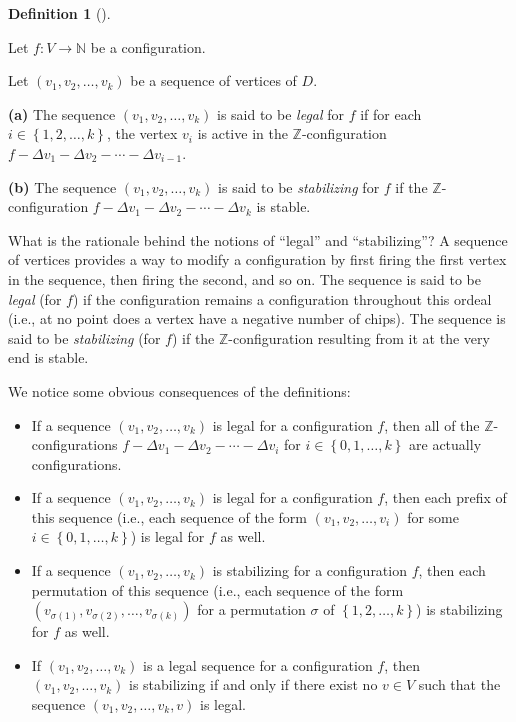 \documentclass[numbers=enddot,12pt,final,onecolumn,notitlepage]{scrartcl}%
\theoremstyle{definition}
\newtheorem{defi}[theo]{Definition}
\newenvironment{definition}[1][]
{\begin{defi}[#1]\begin{leftbar}}
{\end{leftbar}\end{defi}}
\newcommand{\NN}{\mathbb{N}}
\newcommand{\ZZ}{\mathbb{Z}}
\newcommand{\set}[1]{\left\{ #1 \right\}}
\newcommand{\tup}[1]{\left( #1 \right)}
\begin{document}
\begin{definition}
Let $f : V \to \NN$ be a configuration.

Let $\tup{v_1, v_2, \ldots, v_k}$ be a sequence of vertices of
$D$.

\textbf{(a)} The sequence $\tup{v_1, v_2, \ldots, v_k}$ is said
to be \textit{legal} for $f$ if for each
$i \in \set{1, 2, \ldots, k}$, the vertex $v_i$ is active in
the $\ZZ$-configuration
$f - \Delta v_1 - \Delta v_2 - \cdots - \Delta v_{i-1}$.

\textbf{(b)} The sequence $\tup{v_1, v_2, \ldots, v_k}$ is said
to be \textit{stabilizing} for $f$ if the $\ZZ$-configuration
$f - \Delta v_1 - \Delta v_2 - \cdots - \Delta v_k$ is stable.
\end{definition}

What is the rationale behind the notions of ``legal'' and
``stabilizing''?
A sequence of vertices provides a way to modify a
configuration by first firing the first vertex in the sequence,
then firing the second, and so on.
The sequence is said to be \textit{legal} (for $f$) if the
configuration remains a configuration throughout this ordeal
(i.e., at no point does a vertex have a negative number of
chips).
The sequence is said to be \textit{stabilizing} (for $f$) if
the $\ZZ$-configuration resulting from it at the very end is
stable.

We notice some obvious consequences of the definitions:

\begin{itemize}
 \item If a sequence $\tup{v_1, v_2, \ldots, v_k}$ is legal
       for a configuration $f$, then all of the
       $\ZZ$-configurations
       $f - \Delta v_1 - \Delta v_2 - \cdots - \Delta v_i$
       for $i \in \set{0, 1, \ldots, k}$ are actually
       configurations.
 \item If a sequence $\tup{v_1, v_2, \ldots, v_k}$ is legal
       for a configuration $f$, then each prefix of this
       sequence (i.e., each sequence of the form
       $\tup{v_1, v_2, \ldots, v_i}$ for some
       $i \in \set{0, 1, \ldots, k}$) is legal for $f$ as
       well.
 \item If a sequence $\tup{v_1, v_2, \ldots, v_k}$ is
       stabilizing for a configuration $f$, then each
       permutation of this sequence (i.e., each sequence of
       the form
       $\tup{v_{\sigma\tup{1}}, v_{\sigma\tup{2}}, \ldots,
             v_{\sigma\tup{k}}}$ for a permutation
       $\sigma$ of $\set{1, 2, \ldots, k}$) is stabilizing
       for $f$ as well.
 \item If $\tup{v_1, v_2, \ldots, v_k}$ is a legal sequence
       for a configuration $f$, then
       $\tup{v_1, v_2, \ldots, v_k}$ is stabilizing if and
       only if there exist no $v \in V$ such that the
       sequence $\tup{v_1, v_2, \ldots, v_k, v}$ is legal.
\end{itemize}
\end{document}
